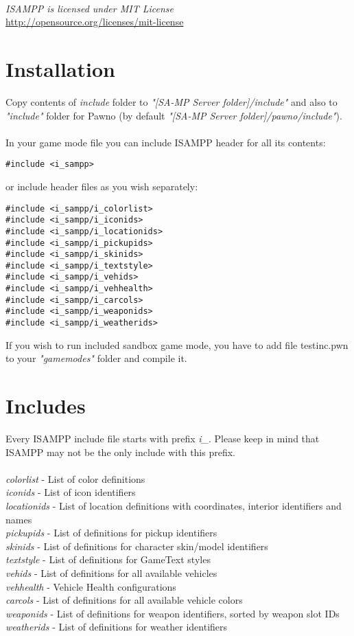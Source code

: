 \documentclass{article}
\begin{document}
\textit{\\ISAMPP is licensed under MIT License} \\\url{http://opensource.org/licenses/mit-license}

\section{Installation}
Copy contents of \textit{include} folder to \textit{"[SA-MP Server folder]/include"} and also to \textit{"include"} folder for Pawno (by default \textit{"[SA-MP Server folder]/pawno/include"}).
\\
\\
In your game mode file you can include ISAMPP header for all its contents:
\begin{verbatim}
#include <i_sampp>
\end{verbatim}
or include header files as you wish separately:
\begin{verbatim}
#include <i_sampp/i_colorlist>
#include <i_sampp/i_iconids>
#include <i_sampp/i_locationids>
#include <i_sampp/i_pickupids>
#include <i_sampp/i_skinids>
#include <i_sampp/i_textstyle>
#include <i_sampp/i_vehids>
#include <i_sampp/i_vehhealth>
#include <i_sampp/i_carcols>
#include <i_sampp/i_weaponids>
#include <i_sampp/i_weatherids>
\end{verbatim}
If you wish to run included sandbox game mode, you have to add file testinc.pwn to your \textit{"gamemodes"} folder and compile it.

\newpage
\section{Includes}
Every ISAMPP include file starts with prefix \textit{i\_}. Please keep in mind that ISAMPP may not be the only include with this prefix.
\\
\\
\textit{colorlist} - List of color definitions
\\
\textit{iconids} - List of icon identifiers
\\
\textit{locationids} - List of location definitions with coordinates, interior identifiers and names
\\
\textit{pickupids} - List of definitions for pickup identifiers
\\
\textit{skinids} - List of definitions for character skin/model identifiers
\\
\textit{textstyle} - List of definitions for GameText styles
\\
\textit{vehids} - List of definitions for all available vehicles
\\
\textit{vehhealth} - Vehicle Health configurations
\\
\textit{carcols} - List of definitions for all available vehicle colors
\\
\textit{weaponids} - List of definitions for weapon identifiers, sorted by weapon slot IDs
\\
\textit{weatherids} - List of definitions for weather identifiers
\end{document}
